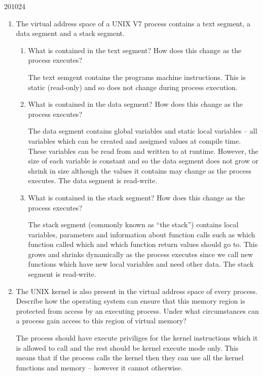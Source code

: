\documentclass[10pt,\jkfside,a4paper]{article}
\begin{document}
\begin{examquestion}{2010}{2}{4}

\begin{enumerate}

\item  The virtual address space of a UNIX V7 process contains a text segment, a data
segment and a stack segment.

\begin{enumerate}

\item What is contained in the text segment? How does this change as the
process executes?

The text semgent contains the programs machine instructions. This is static (read-only)
and so does not change during process execution.

\item What is contained in the data segment? How does this change as the
process executes?

The data segment contains global variables and static local variables -- all 
variables which can be created and assigmed values at compile time. These 
variables can be read from and written to at runtime. However, the size of 
each variable is constant and so the data segment does not grow or shrink 
in size although the values it contains may change as the process executes.
The data segment is read-write.

\item What is contained in the stack segment? How does this change as the
process executes?

The stack segment (commonly known as ``the stack'') contains local variables, parameters 
and information about function calls such as which function called which and which 
function return values should go to. This grows and shrinks dynamically as the process 
executes since we call new functions which have new local variables and need other data.
The stack segment is read-write.

\end{enumerate}

\item The UNIX kernel is also present in the virtual address space of every process.
Describe how the operating system can ensure that this memory region is
protected from access by an executing process. Under what circumstances can
a process gain access to this region of virtual memory?

The process should have execute priviliges for the kernel instructions which it is 
allowed to call and the rest should be kernel execute mode only. This means that if the 
process calls the kernel then they can use all the kernel functions and memory -- however 
it cannot otherwise.


\end{enumerate}
\end{examquestion}
\end{document}
